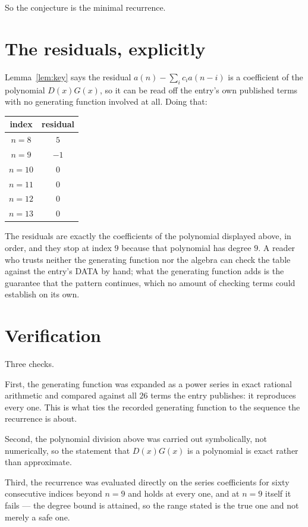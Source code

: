 \documentclass[11pt,a4paper]{article}
\theoremstyle{plain}
\theoremstyle{definition}
\begin{document}
So the conjecture is the minimal recurrence.

\section{The residuals, explicitly}

Lemma~\ref{lem:key} says the residual $a(n)-\sum_ic_ia(n-i)$ is a coefficient of the
polynomial $D(x)G(x)$, so it can be read off the entry's own published terms with no
generating function involved at all. Doing that:
\begin{center}
\begin{tabular}{cc}
index & residual \\ \hline
$n=8$ & $5$ \\
$n=9$ & $-1$ \\
$n=10$ & $0$ \\
$n=11$ & $0$ \\
$n=12$ & $0$ \\
$n=13$ & $0$
\end{tabular}
\end{center}
The residuals are exactly the coefficients of the polynomial displayed above, in order, and
they stop at index $9$ because that polynomial has degree $9$. A reader who trusts
neither the generating function nor the algebra can check the table against the entry's DATA
by hand; what the generating function adds is the guarantee that the pattern continues, which
no amount of checking terms could establish on its own.

\section{Verification}

Three checks.

First, the generating function was expanded as a power series in exact rational arithmetic and
compared against all $26$ terms the entry publishes: it reproduces every one. This is
what ties the recorded generating function to the sequence the recurrence is about.

Second, the polynomial division above was carried out symbolically, not numerically, so the
statement that $D(x)G(x)$ is a polynomial is exact rather than approximate.

Third, the recurrence was evaluated directly on the series coefficients for sixty consecutive
indices beyond $n=9$ and holds at every one, and at $n=9$ itself it fails --- the
degree bound is attained, so the range stated is the true one and not merely a safe one.
\end{document}
